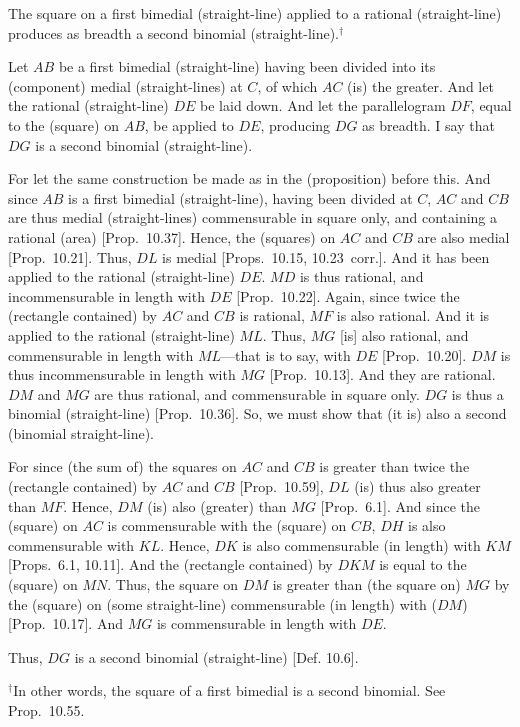 \begin{Parallel}{}{}
{The square on a first bimedial (straight-line)
applied to a rational (straight-line) produces as breadth a second binomial
(straight-line).$^\dag$

Let $AB$ be a first bimedial (straight-line) having been divided into its (component)
medial (straight-lines) at $C$, of which $AC$ (is) the greater. And let
the rational (straight-line) $DE$ be laid down. And let the parallelogram
$DF$, equal to the (square) on $AB$, be applied to $DE$, producing
$DG$ as breadth. I say that $DG$ is a second binomial (straight-line).

For let the same construction be made as in the (proposition) before
this. And since $AB$ is a first bimedial (straight-line), having been divided at $C$, 
$AC$ and $CB$ are thus medial (straight-lines) commensurable
in square only, and containing a rational (area) [Prop.~10.37]. Hence, the (squares) on $AC$ and
$CB$ are also medial [Prop.~10.21]. Thus,
$DL$ is medial [Props.~10.15, 10.23~corr.].  And it has been applied to the
rational (straight-line) $DE$. $MD$ is thus rational, and incommensurable
in length with $DE$ [Prop.~10.22]. Again,
since twice the (rectangle contained) by $AC$ and $CB$ is rational,
$MF$ is also rational. And it is applied to the rational (straight-line)
$ML$. Thus, $MG$ [is] also rational, and commensurable in length
with $ML$---that is to say, with $DE$ [Prop.~10.20]. $DM$ is thus incommensurable in length with $MG$ [Prop.~10.13]. And they are rational. $DM$ and $MG$ are thus rational, and commensurable in square only. $DG$ is thus a binomial (straight-line) [Prop.~10.36]. So, we must show that (it
is) also a second (binomial straight-line).

\epsfysize=1.55in
\centerline{}

For since (the sum of) the squares on $AC$ and $CB$ is greater than twice
the (rectangle contained) by $AC$ and $CB$ [Prop.~10.59], $DL$ (is) thus also greater
than $MF$. Hence, $DM$ (is) also (greater) than $MG$ [Prop.~6.1]. And since
the (square) on $AC$ is commensurable with the (square) on $CB$, $DH$
is also commensurable with $KL$. Hence, $DK$ is also commensurable
(in length) with $KM$ [Props.~6.1, 10.11].  And the (rectangle contained) by $DKM$
is equal to the (square) on $MN$. Thus, the square on $DM$ is greater
than (the square on) $MG$ by the (square) on (some straight-line)
commensurable (in length) with ($DM$) [Prop.~10.17]. And $MG$ is commensurable in length
with $DE$.

Thus, $DG$ is a second binomial (straight-line) [Def. 10.6].}
\end{Parallel}
{\footnotesize\noindent $^\dag$In other words, the square of a first bimedial is a
second binomial. See Prop.~10.55.}

